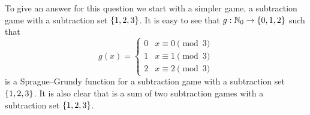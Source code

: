 To give an answer for this question we start with a simpler game,
a subtraction game with a subtraction set $\set{1, 2, 3}$. It is easy to see
that $g : \N_0 \to \set{0, 1, 2}$ such that
\[
  g(x) =
  \begin{cases}
      0 & x \equiv 0 \pmod{3} \\
      1 & x \equiv 1 \pmod{3} \\
      2 & x \equiv 2 \pmod{3}
  \end{cases}
\]
is a Sprague--Grundy function for a subtraction game with a subtraction set
$\set{1, 2, 3}$.
It is also clear that  is a sum of
two subtraction games with a subtraction set $\set{1, 2, 3}$.
